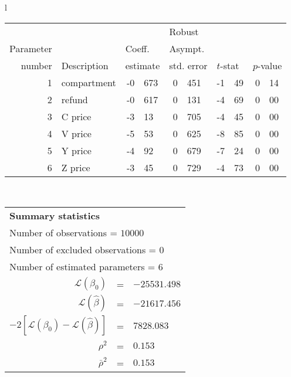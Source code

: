   \begin{tabular}{l}
\begin{tabular}{rlr@{.}lr@{.}lr@{.}lr@{.}l}
         &                       &   \multicolumn{2}{l}{}    & \multicolumn{2}{l}{Robust}  &     \multicolumn{4}{l}{}   \\
Parameter &                       &   \multicolumn{2}{l}{Coeff.}      & \multicolumn{2}{l}{Asympt.}  &     \multicolumn{4}{l}{}   \\
number &  Description                     &   \multicolumn{2}{l}{estimate}      & \multicolumn{2}{l}{std. error}  &   \multicolumn{2}{l}{$t$-stat}  &   \multicolumn{2}{l}{$p$-value}   \\

\hline

1 & compartment & -0&673 & 0&451 & -1&49 & 0&14\\
2 & refund & -0&617 & 0&131 & -4&69 & 0&00\\
3 & C price & -3&13 & 0&705 & -4&45 & 0&00\\
4 & V price & -5&53 & 0&625 & -8&85 & 0&00\\
5 & Y price & -4&92 & 0&679 & -7&24 & 0&00\\
6 & Z price & -3&45 & 0&729 & -4&73 & 0&00\\
\hline
\end{tabular}
\\
\begin{tabular}{rcl}
\multicolumn{3}{l}{\bf Summary statistics}\\
\multicolumn{3}{l}{ Number of observations = $10000$} \\
\multicolumn{3}{l}{ Number of excluded observations = $0$} \\
\multicolumn{3}{l}{ Number of estimated  parameters = $6$} \\
 $\mathcal{L}(\beta_0)$ &=&  $-25531.498$ \\
 $\mathcal{L}(\hat{\beta})$ &=& $-21617.456 $  \\
 $-2[\mathcal{L}(\beta_0) -\mathcal{L}(\hat{\beta})]$ &=& $7828.083$ \\
    $\rho^2$ &=&   $0.153$ \\
    $\bar{\rho}^2$ &=&    $0.153$ \\
\end{tabular}
  \end{tabular}
